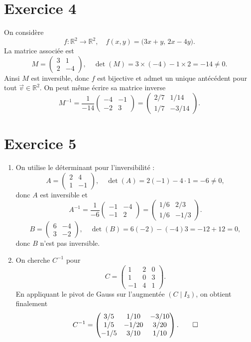 \documentclass{article}
\theoremstyle{definition}
\begin{document}
\section*{Exercice 4}
On considère
$$f:\mathbb R^2\to\mathbb R^2,\quad f(x,y)=\bigl(3x+y,\,2x-4y\bigr).$$
La matrice associée est
$$M=\begin{pmatrix}3&1\\2&-4\end{pmatrix},\quad\det(M)=3\times(-4)-1\times2=-14\neq0.$$
Ainsi $M$ est inversible, donc $f$ est bijective et admet un unique antécédent pour tout $\vec v\in\mathbb R^2$. 
On peut même écrire sa matrice inverse
$$M^{-1}=\frac1{-14}\begin{pmatrix}-4&-1\\-2&3\end{pmatrix}
=\begin{pmatrix}2/7&1/14\\1/7&-3/14\end{pmatrix}.
$$

\section*{Exercice 5}
\begin{enumerate}
  \item On utilise le déterminant pour l'inversibilité :
  $$A=\begin{pmatrix}2&4\\1&-1\end{pmatrix},\quad\det(A)=2(-1)-4\cdot1=-6\neq0,$$
  donc $A$ est inversible et
  $$A^{-1}=\frac1{-6}\begin{pmatrix}-1&-4\\-1&2\end{pmatrix}
    =\begin{pmatrix}1/6&2/3\\1/6&-1/3\end{pmatrix}.
  $$
  $$B=\begin{pmatrix}6&-4\\3&-2\end{pmatrix},\quad\det(B)=6(-2)-(-4)3=-12+12=0,$$
  donc $B$ n'est pas inversible.
  
  \item On cherche $C^{-1}$ pour
  $$C=\begin{pmatrix}1&2&0\\1&0&3\\-1&4&1\end{pmatrix}.$$
  En appliquant le pivot de Gauss sur l'augmentée $(C\mid I_3)$, on obtient finalement
  $$C^{-1}=\begin{pmatrix}3/5&1/10&-3/10\\1/5&-1/20&3/20\\-1/5&3/10&1/10\end{pmatrix}.\qedhere$$
\end{enumerate}
\end{document}
